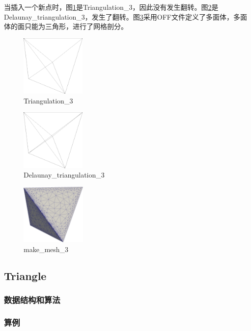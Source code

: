 当插入一个新点时，图\ref{fig:1-5}是Triangulation\_3，因此没有发生翻转。图\ref{fig:1-6}是Delaunay\_triangulation\_3，发生了翻转。图\ref{fig:1-7}采用OFF文件定义了多面体，多面体的面只能为三角形，进行了网格剖分。
\begin{figure}[!htbp]
  \centering
  \includegraphics[height=3cm]{fig/1/5.png}
  \caption{Triangulation\_3}
  \label{fig:1-5}
\end{figure}
\begin{figure}[!htbp]
  \centering
  \includegraphics[height=3cm]{fig/1/6.png}
  \caption{Delaunay\_triangulation\_3}
  \label{fig:1-6}
\end{figure}
\begin{figure}[!htbp]
  \centering
  \includegraphics[height=3cm]{fig/1/7.png}
  \caption{make\_mesh\_3}
  \label{fig:1-7}
\end{figure}


\subsection{Triangle}

\subsubsection{数据结构和算法}

\subsubsection{算例}

